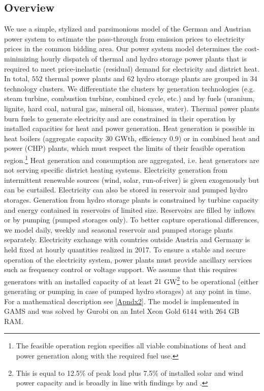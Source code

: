 \documentclass[preprint, 12pt, authoryear]{elsarticle}
\begin{document}
\subsection{Overview}
We use a simple, stylized and parsimonious model of the German and Austrian power system to estimate the pass-through from emission prices to electricity prices in the common bidding area.
Our power system model determines the cost-minimizing hourly dispatch of thermal and hydro storage power plants that is required to meet price-inelastic (residual) demand for electricity and district heat.
In total, $552$ thermal power plants and $62$ hydro storage plants are grouped in $34$ technology clusters. We differentiate the clusters by generation technologies (e.g. steam turbine, combustion turbine, combined cycle, etc.) and by fuels (uranium, lignite, hard coal, natural gas, mineral oil, biomass, water).
Thermal power plants burn fuels to generate electricity and are constrained in their operation by installed capacities for heat and power generation.
Heat generation is possible in heat boilers (aggregate capacity $30$ GWth, efficiency $0.9$) or in combined heat and power (CHP) plants, which must respect the limits of their feasible operation region.\footnote{The feasible operation region specifies all viable combinations of heat and power generation along with the required fuel use.}
Heat generation and consumption are aggregated, i.e. heat generators are not serving specific district heating systems.
Electricity generation from intermittent renewable sources (wind, solar, run-of-river) is given exogenously but can be curtailed.
Electricity can also be stored in reservoir and pumped hydro storages.
Generation from hydro storage plants is constrained by turbine capacity and energy contained in reservoirs of limited size.
Reservoirs are filled by inflows or by pumping (pumped storages only).
To better capture operational differences, we model daily, weekly and seasonal reservoir and pumped storage plants separately.
Electricity exchange with countries outside Austria and Germany is held fixed at hourly quantities realized in 2017.
To ensure a stable and secure operation of the electricity system, power plants must provide ancillary services such as frequency control or voltage support.
We assume that this requires generators with an installed capacity of at least $21$ GW\footnote{This is equal to 12.5\% of peak load plus 7.5\% of installed solar and wind power capacity and is broadly in line with findings by \citet{Hirth2015} and \citet{Nicolosi2012}.} to be operational (either generating or pumping in case of pumped hydro storages) at any point in time.
For a mathematical description see \ref{Apndx2}. The model is implemented in GAMS and was solved by Gurobi on an Intel Xeon Gold $6144$ with $264$ GB RAM.
\end{document}

